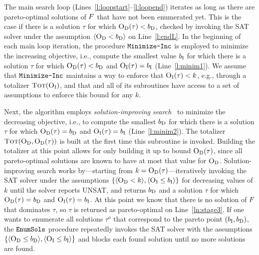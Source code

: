 The main search loop (Lines~\ref{l:loopstart}--\ref{l:loopend}) iterates as long as there are pareto-optimal solutions of $F$ that have not been enumerated yet. 
This is the case if there is a solution $\tau$ for which $\textsc{O}_{\text{D}}(\tau) < b_{\text{D}}$, checked by invoking the SAT solver under the assumption $\langle \textsc{O}_{\text{D}} < b_{\text{D}} \rangle$ on Line~\ref{l:endL}.
In the beginning of each main loop iteration, the procedure $\texttt{Minimize-\allowbreak{}Inc}$ is employed to minimize the increasing objective, i.e., compute the smallest value $b_{\text{I}}$ for which there is a solution $\tau$ for which $\textsc{O}_{\text{D}}(\tau) < b_{\text{D}}$ and $\textsc{O}_{\text{I}}(\tau) = b_{\text{I}}$  (Line~\ref{l:minim1}). 
We assume that $\texttt{Minimize-\allowbreak{}Inc}$ maintains a way to enforce that $\textsc{O}_{\text{I}}(\tau) < k$, e.g., through a totalizer $\textsc{Tot}(\textsc{O}_{\text{I}})$, and that \algname{} and all of its subroutines have access to a set of assumptions to enforce this bound for any $k$.

Next, the algorithm employs \emph{solution-improving search}~\autocite{handbook2-maxsat,DBLP:journals/jsat/BerreP10,DBLP:journals/jsat/EenS06} to minimize the decreasing objective, i.e., to compute the smallest $b_{\text{D}}$ for which there is a solution $\tau$ for which $\textsc{O}_{\text{D}}(\tau) = b_{\text{D}}$ and $\textsc{O}_{\text{I}}(\tau) = b_{\text{I}}$  (Line~\ref{l:minim2}).
The totalizer $\textsc{Tot}(\textsc{O}_{\text{D}}, \textsc{O}_{\text{D}}(\tau))$ is built at the first time this subroutine is invoked.
Building the totalizer at this point allows for only building it up to bound $\textsc{O}_{\text{D}}(\tau)$, since all pareto-optimal solutions are known to have at most that value for $\textsc{O}_{\text{D}}$.
Solution-improving search works by---starting from $k=\textsc{O}_{\text{D}}(\tau)$---iteratively invoking the SAT solver under the assumptions $\{\langle \textsc{O}_{\text{D}} < k \rangle, \langle \textsc{O}_{\text{I}} \leq b_{\text{I}} \rangle\}$ for decreasing values of $k$ until the solver reports UNSAT, and returns $b_{\text{D}}$ and a solution $\tau$ for which $\textsc{O}_{\text{D}}(\tau) = b_{\text{D}}$ and $\textsc{O}_{\text{I}}(\tau) = b_{\text{I}}$.
At this point we know that there is no solution of $F$ that dominates $\tau$, so $\tau$ is returned as pareto-optimal on Line~\ref{ln:stage3}.
If one wants to enumerate all solutions $\tau^o$ that correspond to the pareto point $(b_{\text{I}},b_{\text{D}})$, the $\texttt{EnumSols}$ procedure repeatedly invokes the SAT solver with the assumptions $\{\langle \textsc{O}_{\text{D}} \leq b_{\text{D}} \rangle , \langle \textsc{O}_{\text{I}} \leq b_{\text{I}} \rangle\}$ and blocks each found solution until no more solutions are found.

